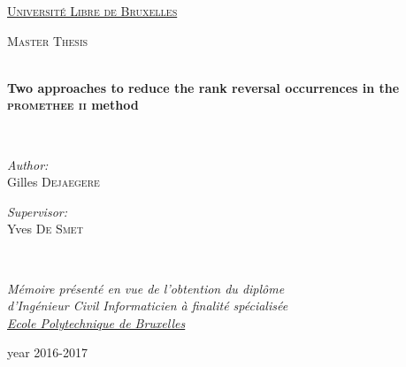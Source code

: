 




\begin{titlepage}
\begin{center}

\vspace*{.06\textheight}
{\scshape\LARGE \href{http://www.ulb.ac.be}{Université Libre de Bruxelles}\par}\vspace{1.5cm} %
\textsc{\Large Master Thesis}\\[0.5cm] %

\HRule \\[0.4cm] %
{\huge \bfseries  Two approaches to reduce the rank reversal occurrences in the  \textsc{promethee ii} method \par}\vspace{0.4cm} %
\HRule \\[1.5cm] %
 
\begin{minipage}[t]{0.4\textwidth}
\begin{flushleft} \large
\emph{Author:}\\
{Gilles \textsc{Dejaegere}} %
\end{flushleft}
\end{minipage}
\begin{minipage}[t]{0.4\textwidth}
\begin{flushright} \large
\emph{Supervisor:} \\
{Yves \textsc{De Smet}} %
\end{flushright}
\end{minipage}\\[3cm]
 
\vfill

\large \textit{Mémoire présenté en vue de l’obtention du diplôme\\ 
    d'Ingénieur Civil Informaticien à finalité spécialisée \\
    \href{http://www.ulb.ac.be/facs/polytech}{Ecole Polytechnique de Bruxelles}}\\[0.3cm] %
 
\vfill

{\large year 2016-2017}\\[4cm] %

\end{center}
\end{titlepage}
